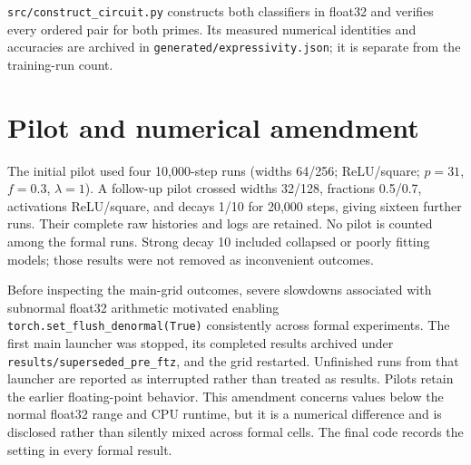 \documentclass{article}
\begin{document}
\texttt{src/construct\_circuit.py} constructs both classifiers in float32 and verifies every ordered pair for both primes. Its measured numerical identities and accuracies are archived in \texttt{generated/expressivity.json}; it is separate from the training-run count.

\section{Pilot and numerical amendment}
The initial pilot used four 10,000-step runs (widths 64/256; ReLU/square; $p=31$, $f=0.3$, $\lambda=1$). A follow-up pilot crossed widths 32/128, fractions 0.5/0.7, activations ReLU/square, and decays 1/10 for 20,000 steps, giving sixteen further runs. Their complete raw histories and logs are retained. No pilot is counted among the formal runs. Strong decay 10 included collapsed or poorly fitting models; those results were not removed as inconvenient outcomes.

Before inspecting the main-grid outcomes, severe slowdowns associated with subnormal float32 arithmetic motivated enabling \texttt{torch.set\_flush\_denormal(True)} consistently across formal experiments. The first main launcher was stopped, its completed results archived under \texttt{results/superseded\_pre\_ftz}, and the grid restarted. Unfinished runs from that launcher are reported as interrupted rather than treated as results. Pilots retain the earlier floating-point behavior. This amendment concerns values below the normal float32 range and CPU runtime, but it is a numerical difference and is disclosed rather than silently mixed across formal cells. The final code records the setting in every formal result.
\end{document}
